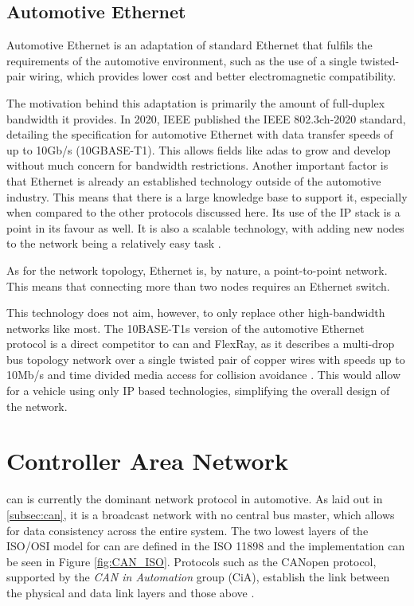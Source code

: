 \subsection{Automotive Ethernet}

Automotive Ethernet is an adaptation of standard Ethernet that fulfils the requirements of the automotive environment, such as the use of a single twisted-pair wiring, which provides lower cost and better electromagnetic compatibility.\par

The motivation behind this adaptation is primarily the amount of full-duplex bandwidth it provides. In 2020, IEEE published the IEEE 802.3ch-2020 standard, detailing the specification for automotive Ethernet with data transfer speeds of up to 10Gb/s (10GBASE-T1). This allows fields like \gls{adas} to grow and develop without much concern for bandwidth restrictions. Another important factor is that Ethernet is already an established technology outside of the automotive industry. This means that there is a large knowledge base to support it, especially when compared to the other protocols discussed here. Its use of the IP stack is a point in its favour as well. It is also a scalable technology, with adding new nodes to the network being a relatively easy task \citep{Bello2011}.\par

As for the network topology, Ethernet is, by nature, a point-to-point network. This means that connecting more than two nodes requires an Ethernet switch.\par

This technology does not aim, however, to only replace other high-bandwidth networks like \gls{most}. The 10BASE-T1s version of the automotive Ethernet protocol is a direct competitor to \gls{can} and FlexRay, as it describes a multi-drop bus topology network over a single twisted pair of copper wires with speeds up to 10Mb/s and time divided media access for collision avoidance \citep{AutomotiveNetworks}. This would allow for a vehicle using only IP based technologies, simplifying the overall design of the network.

\section{Controller Area Network}
\label{s:can}

\gls{can} is currently the dominant network protocol in automotive. As laid out in \ref{subsec:can}, it is a broadcast network with no central bus master, which allows for data consistency across the entire system. The two lowest layers of the ISO/OSI model for \gls{can} are defined in the ISO 11898 \citep{Richards2002} and the implementation can be seen in Figure \ref{fig:CAN_ISO}. Protocols such as the CANopen protocol, supported by the \emph{CAN in Automation} group (CiA), establish the link between the physical and data link layers and those above \citep{Corrigan2002}.

